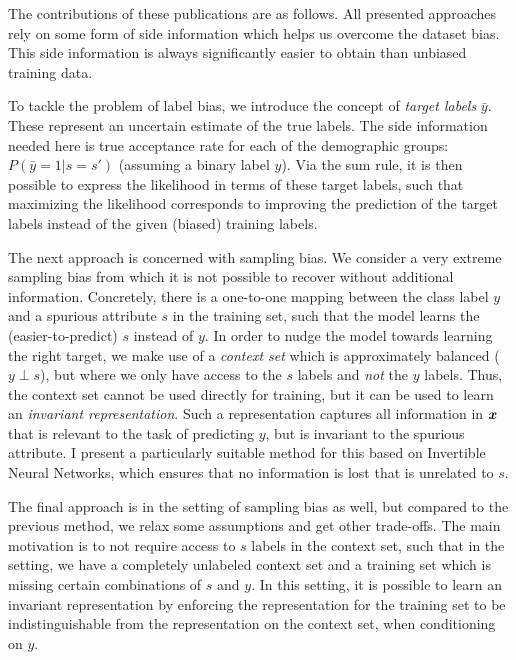 The contributions of these publications are as follows.
All presented approaches rely on some form of side information which helps us overcome the dataset bias.
This side information is always significantly easier to obtain than unbiased training data.

To tackle the problem of label bias, we introduce the concept of \emph{target labels} $\bar{y}$.
These represent an uncertain estimate of the true labels.
The side information needed here is true acceptance rate for each of the demographic groups: $P(\bar{y}=1|s=s')$
(assuming a binary label $y$).
Via the sum rule, it is then possible to express the likelihood in terms of these target labels,
such that maximizing the likelihood corresponds to improving the prediction of the target labels
instead of the given (biased) training labels.

The next approach is concerned with sampling bias.
We consider a very extreme sampling bias from which it is not possible to recover without additional information.
Concretely, there is a one-to-one mapping between the class label $y$ and a spurious attribute $s$ in the training set,
such that the model learns the (easier-to-predict) $s$ instead of $y$.
In order to nudge the model towards learning the right target,
we make use of a \emph{context set} which is approximately balanced ($y\perp s$),
but where we only have access to the $s$ labels and \emph{not} the $y$ labels.
Thus, the context set cannot be used directly for training, but it can be used to learn an \emph{invariant representation}.
Such a representation captures all information in ${\bm{x}}$ that is relevant to the task of predicting $y$,
but is invariant to the spurious attribute.
I present a particularly suitable method for this based on Invertible Neural Networks,
which ensures that no information is lost that is unrelated to $s$.

The final approach is in the setting of sampling bias as well,
but compared to the previous method, we relax some assumptions and get other trade-offs.
The main motivation is to not require access to $s$ labels in the context set,
such that in the setting, we have a completely unlabeled context set
and a training set which is missing certain combinations of $s$ and $y$.
In this setting, it is possible to learn an invariant representation
by enforcing the representation for the training set to be indistinguishable from the representation on the context set,
when conditioning on $y$.
